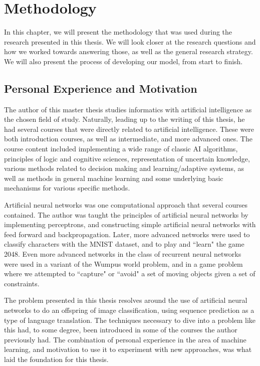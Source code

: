 
\chapter{Methodology}
\label{ch:methodology}
In this chapter, we will present the methodology that was used during the research presented in this thesis. We will look closer at the research questions and how we worked towards answering those, as well as the general research strategy. We will also present the process of developing our model, from start to finish.


\section{Personal Experience and Motivation}
The author of this master thesis studies informatics with artificial intelligence as the chosen field of study. Naturally, leading up to the writing of this thesis, he had several courses that were directly related to artificial intelligence. These were both introduction courses, as well as intermediate, and more advanced ones. The course content included implementing a wide range of classic AI algorithms, principles of logic and cognitive sciences, representation of uncertain knowledge, various methods related to decision making and learning/adaptive systems, as well as methods in general machine learning and some underlying basic mechanisms for various specific methods. 

Artificial neural networks was one computational approach that several courses contained. The author was taught the principles of artificial neural networks by implementing perceptrons, and constructing simple artificial neural networks with feed forward and backpropagation. Later, more advanced networks were used to classify characters with the MNIST dataset, and to play and ``learn" the game 2048. Even more advanced networks in the class of recurrent neural networks were used in a variant of the Wumpus world problem, and in a game problem where we attempted to ``capture" or ``avoid" a set of moving objects given a set of constraints.

The problem presented in this thesis resolves around the use of artificial neural networks to do an offspring of image classification, using sequence prediction as a type of language translation. The techniques necessary to dive into a problem like this had, to some degree, been introduced in some of the courses the author previously had. The combination of personal experience in the area of machine learning, and motivation to use it to experiment with new approaches, was what laid the foundation for this thesis.

